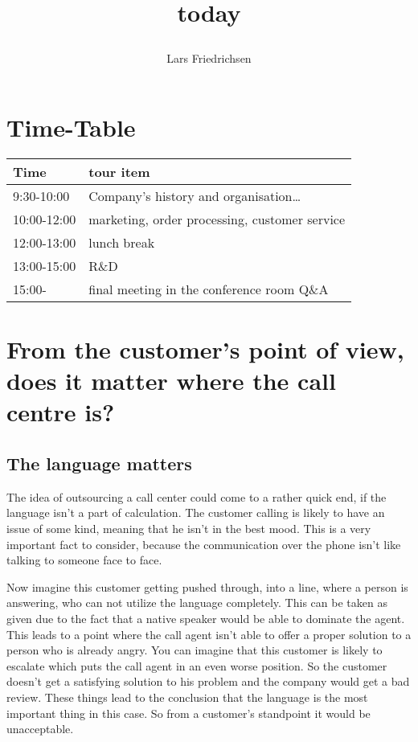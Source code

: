 \documentclass[a4paper,11pt]{scrartcl}%
\title{today\author{Lars Friedrichsen}}
\begin{document}
\section{Time-Table}

\begin{tabular}{|l|l|}
	\hline
	Time		&	tour item\\ \hline
	9:30-10:00	&	Company's history and organisation\ldots\\ \hline
	10:00-12:00	&	marketing, order processing, customer service\\ \hline
	12:00-13:00	&	lunch break\\ \hline
	13:00-15:00	&	R\&D\\ \hline
	15:00-		&	final meeting in the conference room Q\&A\\ \hline
\end{tabular}

\section{From the customer's point of view, does it matter where the call centre is?}
	
	\subsection{The language matters}
	The idea of outsourcing a call center could come to a rather quick end, if the language isn't a part of calculation.
	The customer calling is likely to have an issue of some kind, meaning that he isn't in the best mood. This is a
	very important fact to consider, because the communication over the phone isn't like talking to someone face to face.\par
	Now imagine this customer getting pushed through, into a line, where a person is answering, who can not utilize the
	language completely. This can be taken as given due to the fact that a native speaker would be able to dominate the
	agent. This leads to a point where the call agent isn't able to offer a proper solution to a person who is already
	angry. You can imagine that this customer is likely to escalate which puts the call agent in an even worse position.
	So the customer doesn't get a satisfying solution to his problem and the company would get a bad review.
	These things lead to the conclusion that the language is the most important thing in this case. So from a customer's
	standpoint it would be unacceptable.
	
\end{document}
